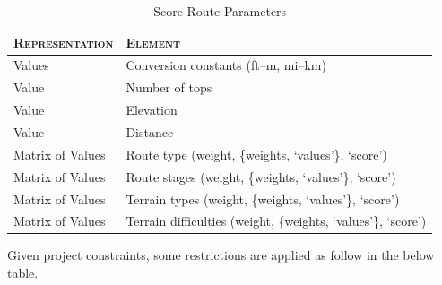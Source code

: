 \documentclass[11pt, english]{article}
\begin{document}
	\begin{table}[h]
		\scriptsize
		\renewcommand{\arraystretch}{1.25}
	\begin{center}
	\begin{tabular}{l|l}
		\textsc{Representation} & \textsc{Element}\\
		\hline
		\hline
		Values & Conversion constants (ft--m, mi--km)\\
		Value & Number of tops\\
		Value & Elevation\\
		Value & Distance\\
		Matrix of Values & Route type (weight, \{weights, `values'\}, `score')\\
		Matrix of Values & Route stages (weight, \{weights, `values'\}, `score')\\
		Matrix of Values & Terrain types (weight, \{weights, `values'\}, `score')\\
		Matrix of Values & Terrain difficulties (weight, \{weights, `values'\}, `score')\\
		\hline
		\hline
	\end{tabular}
		\caption{Score Route Parameters}
	\end{center}
	\end{table}	

	Given project constraints, some restrictions are applied as follow in the below table.
\end{document}
